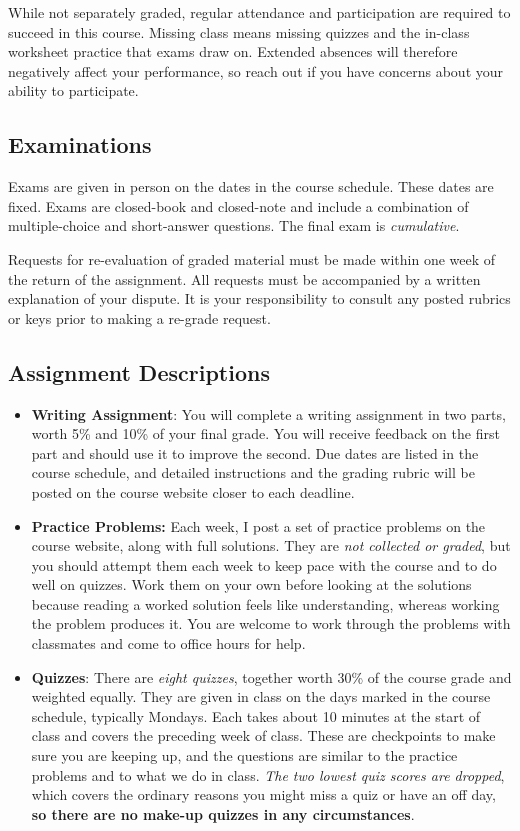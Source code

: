 \documentclass{syllabus}
\begin{document}
While not separately graded, regular attendance and participation are required to succeed in this course. Missing class means missing quizzes and the in-class worksheet practice that exams draw on. Extended absences will therefore negatively affect your performance, so reach out if you have concerns about your ability to participate.

\subsection*{Examinations}

Exams are given in person on the dates in the course schedule. These dates are fixed. Exams are closed-book and closed-note and include a combination of multiple-choice and short-answer questions. The final exam is \textit{cumulative}.

Requests for re-evaluation of graded material must be made within one week of the return of the assignment. All requests must be accompanied by a written explanation of your dispute. It is your responsibility to consult any posted rubrics or keys prior to making a re-grade request.


\subsection*{Assignment Descriptions}

\begin{itemize}
	\item \textbf{Writing Assignment}: You will complete a writing assignment in two parts, worth 5\% and 10\% of your final grade. You will receive feedback on the first part and should use it to improve the second. Due dates are listed in the course schedule, and detailed instructions and the grading rubric will be posted on the course website closer to each deadline.
\item \textbf{Practice Problems:} Each week, I post a set of practice problems on the course website, along with full solutions. They are \textit{not collected or graded}, but you should attempt them each week to keep pace with the course and to do well on quizzes. Work them on your own before looking at the solutions because reading a worked solution feels like understanding, whereas working the problem produces it. You are welcome to work through the problems with classmates and come to office hours for help.
\item \textbf{Quizzes}: There are \textit{eight quizzes}, together worth 30\% of the course grade and weighted equally. They are given in class on the days marked in the course schedule, typically Mondays. Each takes about 10 minutes at the start of class and covers the preceding week of class. These are checkpoints to make sure you are keeping up, and the questions are similar to the practice problems and to what we do in class. \textit{The two lowest quiz scores are dropped}, which covers the ordinary reasons you might miss a quiz or have an off day, \textbf{so there are no make-up quizzes in any circumstances}.
\end{itemize}
\end{document}

